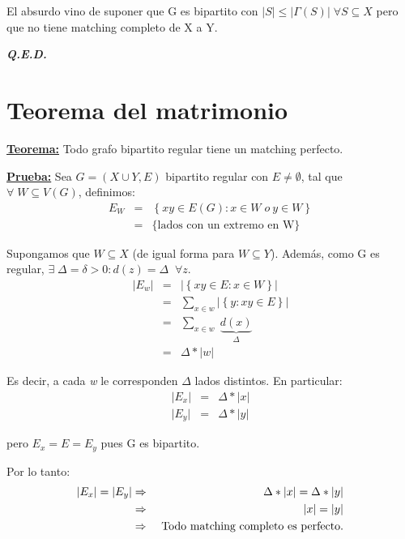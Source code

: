 \documentclass[12pt,a4paper]{report}
\newcounter{neq}
\newcommand{\QED}{\hfill \textit{\textbf{Q.E.D.}}}
\begin{document}
			\par El absurdo vino de suponer que G es bipartito con $\lvert S \rvert \leq \lvert \Gamma(S) \rvert \; \forall S \subseteq X$ pero que no tiene matching completo de X a Y.

		\QED

	\pagebreak
	\section{Teorema del matrimonio}
		\textbf{\underline{Teorema:}} Todo grafo bipartito regular tiene un matching perfecto.

		\textbf{\underline{Prueba:}} Sea $G = (X \cup Y, E)$ bipartito regular con $E \neq \emptyset $, tal que $\forall \; W \subseteq V(G)$, definimos:
			\begin{eqnarray}
				\nonumber E_{W} &=& \left\lbrace xy \in E(G): x \in W \; o \ y \in W \right\rbrace \\
				\nonumber &=& \lbrace \text{lados con un extremo en W} \rbrace
			\end{eqnarray}

			\par Supongamos que $W \subseteq X$ (de igual forma para $W \subseteq Y$). Además, como G es regular, $\exists \; \Delta  = \delta > 0 : d(z) = \Delta \; \; \forall z$.
			\begin{eqnarray}
				\nonumber \lvert E_{w} \rvert &=& \lvert \left\lbrace xy \in E: x \in W \right\rbrace \rvert \\
				\nonumber &=& \sum_{x \in w} \lvert \left\lbrace y : xy \in E \right\rbrace \rvert \\
				\nonumber &=& \sum_{x \in w} \; \underbrace{d(x)}_{\Delta} \\
				\nonumber &=& \Delta * \lvert w \rvert
			\end{eqnarray}

			\par Es decir, a cada \textit{w} le corresponden $\Delta$ lados distintos. En particular:
			\begin{eqnarray}
				\nonumber \lvert E_{x} \rvert &=& \Delta * \lvert x \rvert \\
				\nonumber \lvert E_{y} \rvert &=& \Delta * \lvert y \rvert
			\end{eqnarray}
			\par pero $E_{x} = E = E_{y}$ pues G es bipartito.

			\vspace{5mm}
			\par Por lo tanto:
			\begin{eqnarray}
				\nonumber \lvert E_{x} \rvert = \lvert E_{y} \rvert &\Rightarrow & \Delta * \lvert x \rvert = \Delta * \lvert y \rvert \\
				\nonumber &\Rightarrow & \lvert x \rvert = \lvert y \rvert \\
				\nonumber &\Rightarrow & \textup{ Todo matching completo es perfecto.}
			\end{eqnarray}
\end{document}
